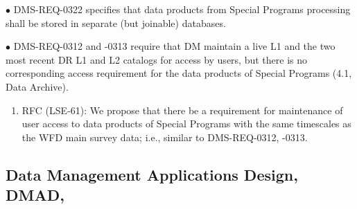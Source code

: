 \documentclass[DM,lsstdraft,toc]{lsstdoc}
\begin{document}
$\bullet$ DMS-REQ-0322 specifies that data products from Special Programs processing shall be stored in separate (but joinable) databases.

$\bullet$ DMS-REQ-0312 and -0313 require that DM maintain a live L1 and the two most recent DR L1 and L2 catalogs for access by users, but there is no corresponding access requirement for the data products of Special Programs (4.1, Data Archive).
\begin{enumerate}[resume,topsep=-10pt,after=\vspace{10pt},label= \textbf{Action \Roman*}] \item \label{DMSR-7} RFC (LSE-61): We propose that there be a requirement for maintenance of user access to data products of Special Programs with the same timescales as the WFD main survey data; i.e., similar to DMS-REQ-0312, -0313. \end{enumerate}





\subsection{Data Management Applications Design, DMAD, }\label{ssec:docrev_dmad}
\end{document}
